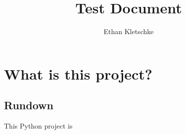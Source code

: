 \documentclass[12pt]{article}
\title{Test Document}
\author{Ethan Kletschke}
\begin{document}
    \maketitle

    \newpage

    \section{What is this project?}

    \subsection{Rundown}

    This Python project is 
\end{document}
